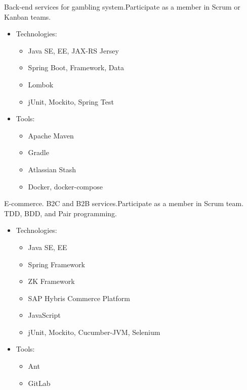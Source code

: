 \documentclass[11pt, a4paper]{moderncv}
\begin{document}
{Back-end services for gambling system.\newline{}Participate as a member in Scrum or Kanban teams.
\begin{itemize}
\item Technologies:
\begin{itemize}
\item Java SE, EE, JAX-RS Jersey
\item Spring Boot, Framework, Data
\item Lombok 
\item jUnit, Mockito, Spring Test
\end{itemize}
\item Tools:
\begin{itemize}
\item Apache Maven
\item Gradle
\item Atlassian Stash
\item Docker, docker-compose
\end{itemize}
\end{itemize}}

{E-commerce. B2C and B2B services.\newline{}Participate as a member in Scrum team. TDD, BDD, and Pair programming. 
\begin{itemize}
\item Technologies:
\begin{itemize}
\item Java SE, EE
\item Spring Framework
\item ZK Framework
\item SAP Hybris Commerce Platform
\item JavaScript
\item jUnit, Mockito, Cucumber-JVM, Selenium
\end{itemize}
\item Tools:
\begin{itemize}
\item Ant
\item GitLab
\end{itemize}
\end{itemize}}
\end{document}
